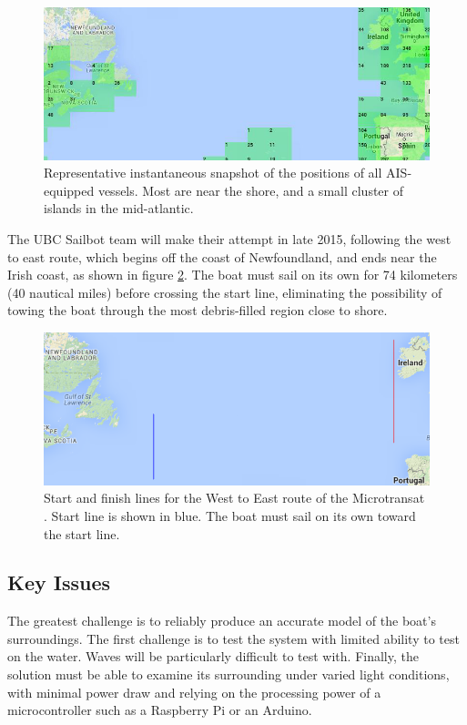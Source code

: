 \begin{figure}[H]
\centering
\includegraphics[width=150mm,natwidth=792,natheight=313]{"./image/AIS_emitters_north_atlantic_2"}
\caption[Instantaneous position of AIS vessels.]{\label{fig:ais-snapshot}Representative instantaneous snapshot of the positions of all AIS-equipped vessels. Most are near the shore, and a small cluster of islands in the mid-atlantic.}
\end{figure}

The UBC Sailbot team will make their attempt in late 2015, following the west to east route, which begins off the coast of Newfoundland, and ends near the Irish coast, as shown in figure \ref{fig:w-e_start-finish}. The boat must sail on its own for 74 kilometers (40 nautical miles) before crossing the start line, eliminating the possibility of towing the boat through the most debris-filled region close to shore.

\begin{figure}[H]
\centering
\includegraphics[width=150mm,natwidth=667,natheight=264]{"./image/start-finish_map"}
\caption[Microtransat keypoints.]{\label{fig:w-e_start-finish}Start and finish lines for the West to East route of the Microtransat \cite{transat__w-e_start-finish}. Start line is shown in blue. The boat must sail on its own toward the start line. }
\end{figure}

\subsection{\label{sec:intro:key-issues}Key Issues}
The greatest challenge is to reliably produce an accurate model of the boat's surroundings. The first challenge is to test the system with limited ability to test on the water.  Waves will be particularly difficult to test with.  Finally, the solution must be able to examine its surrounding under varied light conditions, with minimal power draw and relying on the processing power of a microcontroller such as a Raspberry Pi or an Arduino.

